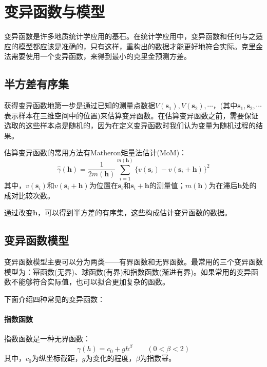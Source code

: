 \section{变异函数与模型}
变异函数是许多地质统计学应用的基石。在统计学应用中，变异函数和任何与之适应的模型都应该是准确的，只有这样，重构出的数据才能更好地符合实际。克里金法需要使用一个变异函数，来得到最小的克里金预测方差。

\subsection{半方差有序集}
获得变异函数地第一步是通过已知的测量点数据$ V\left( \mathbf{s}_{1} \right) , V\left( \mathbf{s}_{2} \right) , \cdots $，(其中$ \mathbf{s}_{1} , \mathbf{s}_{2} , \cdots $表示样本在三维空间中的位置)来估算变异函数。在估算变异函数之前，需要保证选取的这些样本点是随机的，因为在定义变异函数时我们认为变量为随机过程的结果。

估算变异函数的常用方法有Matheron矩量法估计(MoM)：
\begin{equation}
    \hat{\gamma}\left( \mathbf{h} \right) = \frac{1}{2m\left( \mathbf{h} \right)} \sum_{i=1}^{m\left( \mathbf{h} \right)} \{v\left( \mathbf{s}_{i} \right) - v\left( \mathbf{s}_{i} + \mathbf{h} \right)\}^{2}
    \label{Matheron矩量法估计}
\end{equation}
其中，$ v\left( \mathbf{s}_{i} \right) $和$ v\left( \mathbf{s}_{i} + \mathbf{h} \right) $为位置在$ \mathbf{s}_{i} $和$ \mathbf{s}_{i} + \mathbf{h} $的测量值；$ m\left( \mathbf{h} \right) $为在滞后$ \mathbf{h} $处的成对比较次数。

通过改变$ \mathbf{h} $，可以得到半方差的有序集，这些构成估计变异函数的数据。

\subsection{变异函数模型}
变异函数模型主要可以分为两类——有界函数和无界函数。最常用的三个变异函数模型为：幂函数(无界)、球函数(有界)和指数函数(渐进有界)。如果常用的变异函数不能够符合实际值，也可以拟合更加复杂的函数。

下面介绍四种常见的变异函数：
\paragraph{指数函数}
指数函数是一种无界函数：
\begin{equation}
    \gamma\left( h \right) = c_{0} + g h^{\beta} \qquad \left( 0 < \beta < 2 \right)
\end{equation}
其中，$ c_{0} $为纵坐标截距，$ g $为变化的程度，$ \beta $为指数幂。
